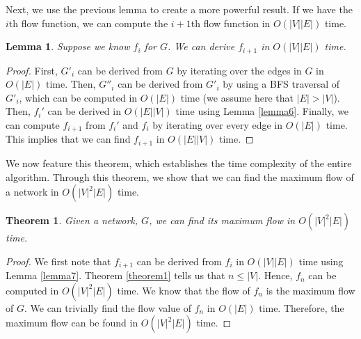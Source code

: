 \documentclass{report}
\newtheorem{lemma}{Lemma}[section]
\newtheorem{theorem}{Theorem}[section]
\begin{document}
Next, we use the previous lemma to create a more powerful result. If we have the $i$th flow function, we can compute the $i+1$th flow function in $O(|V||E|)$ time.
\begin{lemma}
    Suppose we know $f_i$ for $G$. We can derive $f_{i+1}$ in $O(|V||E|)$ time.
\end{lemma}
\begin{proof}
    First, $G'_i$ can be derived from $G$ by iterating over the edges in $G$ in $O(|E|)$ time. Then, $G''_i$ can be derived from $G'_i$ by using a BFS traversal of $G'_i$, which can be computed in $O(|E|)$ time (we assume here that $|E| > |V|$). Then, $f_i'$ can be derived in $O(|E||V|)$ time using Lemma \ref{lemma6}. Finally, we can compute $f_{i+1}$ from $f_i'$ and $f_i$ by iterating over every edge in $O(|E|)$ time. This implies that we can find $f_{i+1}$ in $O(|E||V|)$ time.
\end{proof}

We now feature this theorem, which establishes the time complexity of the entire algorithm. Through this theorem, we show that we can find the maximum flow of a network in $O(|V|^2|E|)$ time.
\begin{theorem}
    Given a network, $G$, we can find its maximum flow in $O(|V|^2|E|)$ time.
\end{theorem}
\begin{proof}
    We first note that $f_{i+1}$ can be derived from $f_i$ in $O(|V||E|)$ time using Lemma \ref{lemma7}. Theorem \ref{theorem1} tells us that $n \le |V|$. Hence, $f_n$ can be computed in $O(|V|^2|E|)$ time. We know that the flow of $f_n$ is the maximum flow of $G$. We can trivially find the flow value of $f_n$ in $O(|E|)$ time. Therefore, the maximum flow can be found in $O(|V|^2|E|)$ time.
\end{proof}
\end{document}
